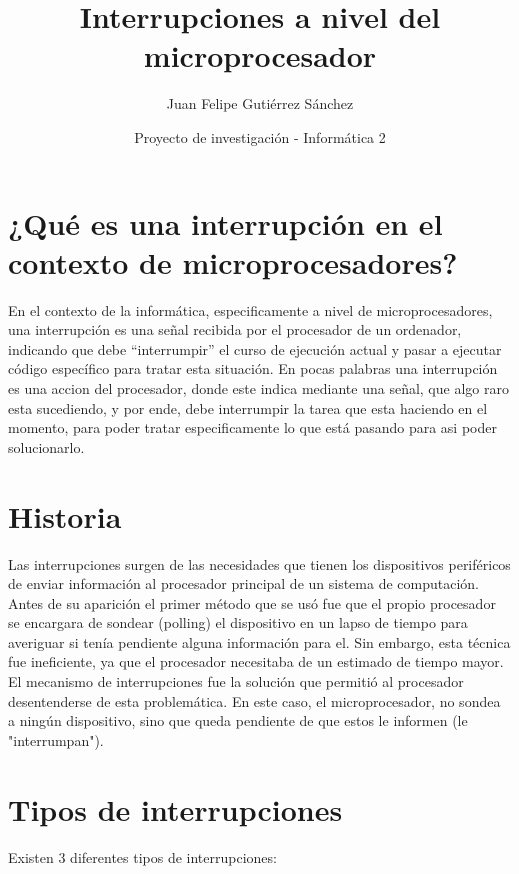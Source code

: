 \documentclass{article}
\title{Interrupciones a nivel del microprocesador}
\author{Juan Felipe Gutiérrez Sánchez }
\date{Proyecto de investigación - Informática 2}
\begin{document}
\maketitle

\section{¿Qué es una interrupción en el contexto de microprocesadores?}

En el contexto de la informática, especificamente a nivel de microprocesadores, una interrupción es una señal recibida por el procesador de un ordenador, indicando que debe “interrumpir” el curso de ejecución actual y pasar a ejecutar código específico para tratar esta situación.
En pocas palabras una interrupción es una accion del procesador, donde este indica mediante una señal, que algo raro esta sucediendo, y por ende, debe interrumpir la tarea que esta haciendo en el momento, para poder tratar especificamente lo que está pasando para asi poder solucionarlo.
\\[0,5cm]
\section{Historia}
Las interrupciones surgen de las necesidades que tienen los dispositivos periféricos de enviar información al procesador principal de un sistema de computación. Antes de su aparición el primer método que se usó fue que el propio procesador se encargara de sondear (polling) el dispositivo en un lapso de tiempo para averiguar si tenía pendiente alguna información para el. Sin embargo, esta técnica fue ineficiente, ya que el procesador necesitaba de un estimado de tiempo mayor. El mecanismo de interrupciones fue la solución que permitió al procesador desentenderse de esta problemática. En este caso, el microprocesador, no sondea a ningún dispositivo, sino que queda pendiente
de que estos le informen (le "interrumpan").
\\[0.5cm]

\section{Tipos de interrupciones}

Existen 3 diferentes tipos de interrupciones:
\end{document}
